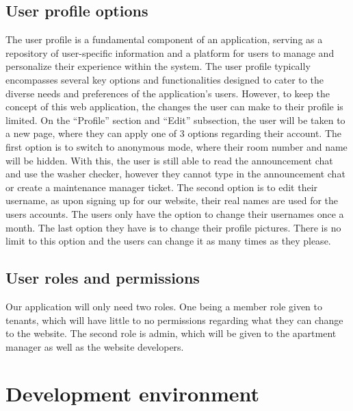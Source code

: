 \documentclass[conference]{IEEEtran}
\begin{document}
\subsection{User profile options}
The user profile is a fundamental component of an application, serving as a repository of user-specific information and a platform for users to manage and personalize their experience within the system. The user profile typically encompasses several key options and functionalities designed to cater to the diverse needs and preferences of the application's users. However, to keep the concept of this web application, the changes the user can make to their profile is limited. On the “Profile” section and “Edit” subsection, the user will be taken to a new page, where they can apply one of 3 options regarding their account. The first option is to switch to anonymous mode, where their room number and name will be hidden. With this, the user is still able to read the announcement chat and use the washer checker, however they cannot type in the announcement chat or create a maintenance manager ticket. The second option is to edit their username, as upon signing up for our website, their real names are used for the users accounts. The users only have the option to change their usernames once a month. The last option they have is to change their profile pictures. There is no limit to this option and the users can change it as many times as they please.
\subsection{User roles and permissions}
Our application will only need two roles. One being a member role given to tenants, which will have little to no permissions regarding what they can change to the website. The second role is admin, which will be given to the apartment manager as well as the website developers.


\section{Development environment}
\end{document}
